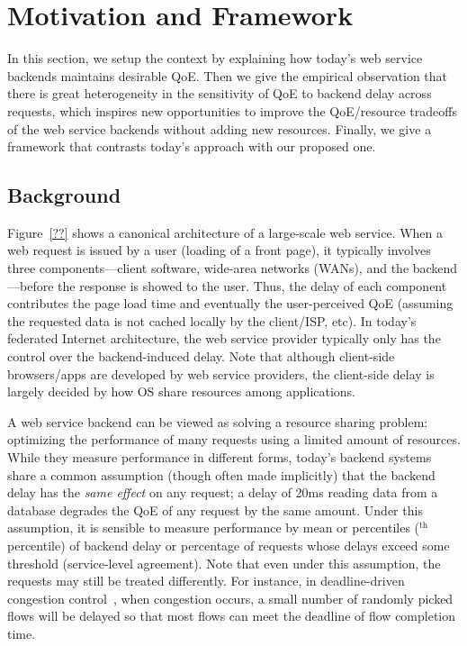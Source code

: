 
\section{Motivation and Framework}
In this section, we setup the context by explaining how today's web service backends maintains desirable QoE.
Then we give the empirical observation that there is great heterogeneity in the sensitivity of QoE to backend delay across requests, which inspires new opportunities to improve the QoE/resource tradeoffs of the web service backends without adding new resources. 
Finally, we give a framework that contrasts today's approach with our proposed one.

\subsection{Background}
Figure~\ref{??} shows a canonical architecture of a large-scale web service. 
When a web request is issued by a user (\eg loading of a front page), it typically involves three components---client software, wide-area networks (WANs), and the backend---before the response is showed to the user.
Thus, the delay of each component contributes the page load time and eventually the user-perceived QoE (assuming the requested data is not cached locally by the client/ISP, etc). 
In today's federated Internet architecture, the web service provider typically only has the control over the backend-induced delay. 
Note that although client-side browsers/apps are developed by web service providers, the client-side delay is largely decided by how OS share resources among applications. 


A web service backend can be viewed as solving a resource sharing problem: optimizing the performance of many requests using a limited amount of resources. 
While they measure performance in different forms, today's backend systems share a common assumption (though often made implicitly) that the backend delay has the {\em same effect} on any request; \eg a delay of 20ms reading data from a database degrades the QoE of any request by the same amount. 
Under this assumption, it is sensible to measure performance by mean or percentiles ($^\textrm{th}$ percentile) of backend delay or percentage of requests whose delays exceed some threshold (\eg service-level agreement).
Note that even under this assumption, the requests may still be treated differently. For instance, in deadline-driven congestion control~\cite{??}, when congestion occurs, a small number of randomly picked flows will be delayed so that most flows can meet the deadline of flow completion time. 

